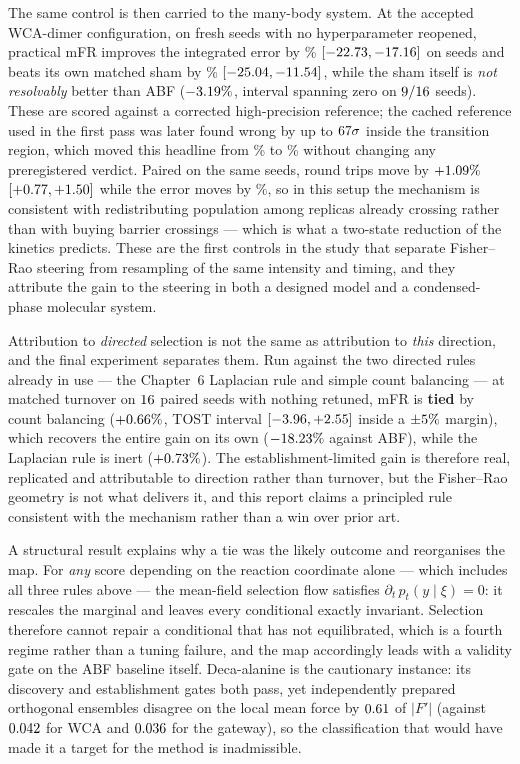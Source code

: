 The same control is then carried to the many-body system. At the accepted WCA-dimer
configuration, on \WcsSeeds{} fresh seeds with no hyperparameter reopened, practical mFR
improves the integrated error by \WcvEstGain\% $[-22.73, -17.16]$ on
\WcvEstWins{} seeds and beats its own matched sham by \WcvDirect\%
$[-25.04, -11.54]$, while the sham itself is \emph{not resolvably} better
than ABF ($-3.19\%$, interval spanning zero on $9/16$ seeds). These are scored against a corrected high-precision reference; the
cached reference used in the first pass was later found wrong by up to $67\sigma$
inside the transition region, which moved this headline from \WcsEstGain\% to
\WcvEstGain\% without changing any preregistered verdict. Paired on the same seeds, round trips move by
$+1.09\%$ $[+0.77, +1.50]$ while the
error moves by \WcvEstGain\%, so in this setup the mechanism is consistent with
redistributing population among replicas already crossing rather than with buying barrier
crossings --- which is what a two-state reduction of the kinetics predicts. These are the first controls in
the study that separate Fisher--Rao steering from resampling of the same intensity and timing,
and they attribute the gain to the steering in both a designed model and a condensed-phase
molecular system.

Attribution to \emph{directed} selection is not the same as attribution to \emph{this}
direction, and the final experiment separates them. Run against the two directed rules already
in use --- the Chapter~6 Laplacian rule and simple count balancing --- at matched turnover on
$16$ paired seeds with nothing retuned, mFR is \textbf{tied} by count balancing
($+0.66\%$, TOST interval $[-3.96, +2.55]$ inside a
$\pm5\%$ margin), which recovers the entire gain on its own
($-18.23\%$ against ABF), while the Laplacian rule is inert ($+0.73\%$).
The establishment-limited gain is therefore real, replicated and attributable to direction
rather than turnover, but the Fisher--Rao geometry is not what delivers it, and this report
claims a principled rule consistent with the mechanism rather than a win over prior art.

A structural result explains why a tie was the likely outcome and reorganises the map. For
\emph{any} score depending on the reaction coordinate alone --- which includes all three rules
above --- the mean-field selection flow satisfies $\partial_t\,p_t(y\mid\xi)=0$: it rescales
the marginal and leaves every conditional exactly invariant. Selection therefore cannot repair
a conditional that has not equilibrated, which is a fourth regime rather than a tuning
failure, and the map accordingly leads with a validity gate on the ABF baseline itself.
Deca-alanine is the cautionary instance: its discovery and establishment gates both pass, yet
independently prepared orthogonal ensembles disagree on the local mean force by $0.61$ of
$|F'|$ (against $0.042$ for WCA and $0.036$ for the gateway), so the classification that
would have made it a target for the method is inadmissible.

